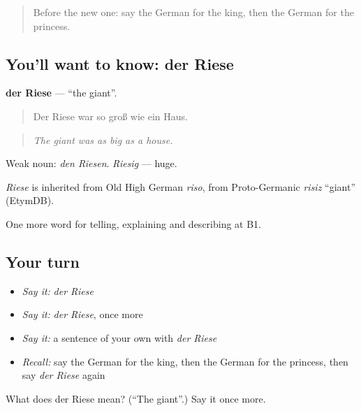 \begin{quote}
Before the new one: say the German for the king, then the German for the princess.
\end{quote}

\subsection*{You'll want to know: der Riese}
\textbf{der Riese} — \textquotedblleft{}the giant\textquotedblright{}.

\begin{quote}
Der Riese war so groß wie ein Haus.
\end{quote}

\begin{quote}
\emph{The giant was as big as a house.}
\end{quote}

Weak noun: \emph{den Riesen}. \emph{Riesig} — huge.

\begin{cousinweb}
\emph{Riese} is inherited from Old High German \emph{riso}, from Proto-Germanic \emph{risiz} \textquotedblleft{}giant\textquotedblright{} (EtymDB).
\end{cousinweb}

\begin{grammarlens}[title={What you've built}]
One more word for telling, explaining and describing at B1.
\end{grammarlens}

\subsection*{Your turn}
\begin{itemize}
\raggedright
  \item \emph{Say it:} \emph{der Riese}
  \item \emph{Say it:} \emph{der Riese}, once more
  \item \emph{Say it:} a sentence of your own with \emph{der Riese}
  \item \emph{Recall:} say the German for the king, then the German for the princess, then say \emph{der Riese} again
\end{itemize}

\begin{tcolorbox}[breakable,colback=teal!4,colframe=teal!35!black,title={Before you move on}]
What does der Riese mean? (\textquotedblleft{}The giant\textquotedblright{}.) Say it once more.
\end{tcolorbox}
